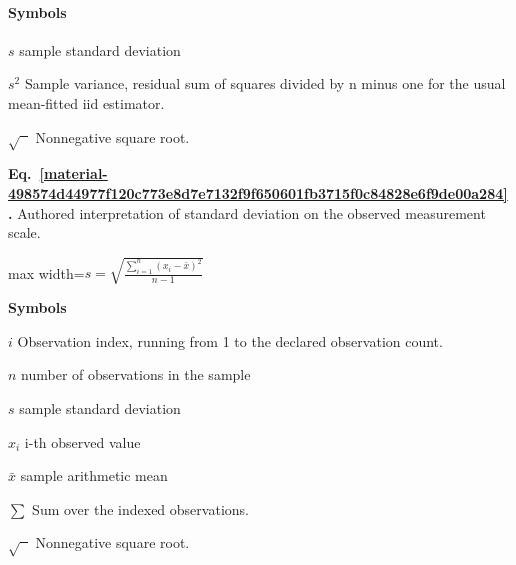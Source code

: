 \documentclass[11pt,a4paper]{article}
\begin{document}
\paragraph{Symbols}
\par\noindent\textbf{\(s\)} sample standard deviation
\par\noindent\textbf{\(s^2\)} Sample variance, residual sum of squares divided by n minus one for the usual mean-fitted iid estimator.
\par\noindent\textbf{\(\sqrt{\phantom{x}}\)} Nonnegative square root.
\medskip

\par\medskip
\noindent\begin{minipage}{\linewidth}
\label{material-498574d44977f120c773e8d7e7132f9f650601fb3715f0c84828e6f9de00a284}
\noindent\textbf{Eq.~\ref*{material-498574d44977f120c773e8d7e7132f9f650601fb3715f0c84828e6f9de00a284}.} Authored interpretation of standard deviation on the observed measurement scale.\par\nopagebreak
\begin{center}\begin{adjustbox}{max width=\linewidth}$\displaystyle s=\sqrt{\frac{\sum_{i=1}^{n}(x_i-\bar{x})^2}{n-1}}$\end{adjustbox}\end{center}

\par\noindent\textbf{Symbols}

\par\noindent\textbf{\(i\)} Observation index, running from 1 to the declared observation count.

\par\noindent\textbf{\(n\)} number of observations in the sample

\par\noindent\textbf{\(s\)} sample standard deviation

\par\noindent\textbf{\(x_i\)} i-th observed value

\par\noindent\textbf{\(\bar{x}\)} sample arithmetic mean

\par\noindent\textbf{\(\sum\)} Sum over the indexed observations.

\par\noindent\textbf{\(\sqrt{\phantom{x}}\)} Nonnegative square root.

\end{minipage}\par
\medskip
\end{document}
